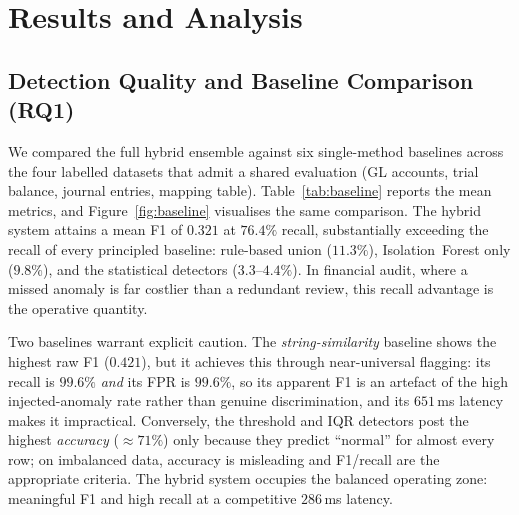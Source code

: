 \documentclass{ieeeaccess}
\begin{document}
\section{Results and Analysis}
\label{sec:results}

\subsection{Detection Quality and Baseline Comparison (RQ1)}
\label{subsec:baseline}
We compared the full hybrid ensemble against six single-method baselines across the four labelled datasets that admit a
shared evaluation (GL accounts, trial balance, journal entries, mapping table). Table~\ref{tab:baseline} reports the mean
metrics, and Figure~\ref{fig:baseline} visualises the same comparison. The hybrid system attains a mean F1 of
$0.321$ at $76.4\%$ recall, substantially exceeding the recall of every principled baseline: rule-based union ($11.3\%$),
Isolation~Forest only ($9.8\%$), and the statistical detectors ($3.3$--$4.4\%$). In financial audit, where a missed
anomaly is far costlier than a redundant review, this recall advantage is the operative quantity.

Two baselines warrant explicit caution. The \emph{string-similarity} baseline shows the highest raw F1 ($0.421$), but it
achieves this through near-universal flagging: its recall is $99.6\%$ \emph{and} its FPR is $99.6\%$, so its apparent F1
is an artefact of the high injected-anomaly rate rather than genuine discrimination, and its $651$\,ms latency makes it
impractical. Conversely, the threshold and IQR detectors post the highest \emph{accuracy} ($\approx71\%$) only because
they predict ``normal'' for almost every row; on imbalanced data, accuracy is misleading and F1/recall are the
appropriate criteria. The hybrid system occupies the balanced operating zone: meaningful F1 and high recall at a
competitive $286$\,ms latency.
\end{document}
